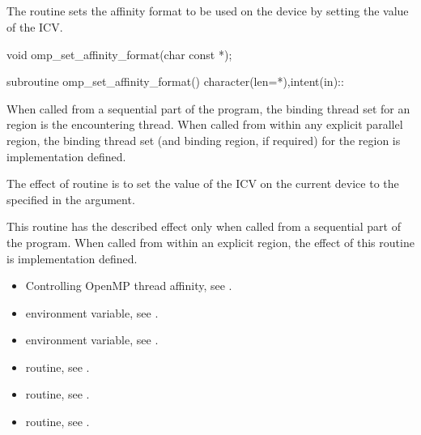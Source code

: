 \subsection{}
\label{subsec:omp_set_affinity_format}

\summary
The  routine sets the affinity format to be used on the device 
by setting the value of the  ICV. 

\format
\begin{ccppspecific}
\begin{ompcFunction}
void omp_set_affinity_format(char const *);
\end{ompcFunction}
\end{ccppspecific}

\begin{fortranspecific}
\begin{ompfSubroutine}
subroutine omp_set_affinity_format()
character(len=*),intent(in)::
\end{ompfSubroutine}
\end{fortranspecific}

\binding
When called from a sequential part of the program, the binding thread set for an 
 region is the encountering thread. When called 
from within any explicit parallel region, the binding thread set (and binding region, if 
required) for the  region is implementation defined. 

\effect
The effect of  routine is to set the value of 
the  ICV on the current device to the  specified 
in the argument.

This routine has the described effect only when called from a sequential part of the 
program. When called from within an explicit  region, the effect of this 
routine is implementation defined.

\crossreferences
\begin{itemize}
\item Controlling OpenMP thread affinity, see 
. 
\item {} environment variable, see 
.
\item {} environment variable, see 
.
\item {} routine, see .
\item {} routine, see .
\item {} routine, see .
\end{itemize}

